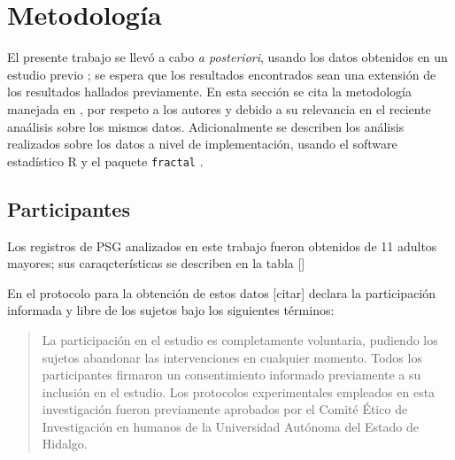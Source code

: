 \chapter{Metodolog\'ia}

El presente trabajo se llev\'o a cabo \textit{a posteriori}, usando los datos obtenidos en un 
estudio previo \cite[V\'azquez Tagle, 2016]{VazquezTagle16}; 
se espera que los resultados encontrados sean una
extensi\'on de los resultados hallados previamente. En esta secci\'on se cita la metodolog\'ia 
manejada en \cite{VazquezTagle16}, por respeto a los autores y debido a su relevancia en el 
reciente ana\'alisis sobre los mismos datos. Adicionalmente se describen los an\'alisis realizados
sobre los datos a nivel de implementaci\'on, usando el software estad\'istico R
y el paquete \texttt{fractal} \cite{R_citar,R_fractal}.


\section{Participantes}

Los registros de PSG analizados en este trabajo fueron obtenidos de 11 adultos mayores; sus
caraqcter\'isticas se describen en la tabla []


En el protocolo para la obtenci\'on de estos datos [citar] declara la participaci\'on informada 
y libre de los sujetos bajo los siguientes t\'erminos:
\begin{quote}
La participaci\'on en el estudio es completamente 
voluntaria, pudiendo los sujetos abandonar las intervenciones en cualquier momento. Todos los 
participantes firmaron un consentimiento informado previamente a su inclusi\'on en el estudio. 
Los protocolos experimentales empleados en esta investigaci\'on fueron previamente aprobados por 
el Comit\'e \'Etico de Investigaci\'on en humanos de la Universidad Autónoma del Estado de Hidalgo.
\end{quote}

